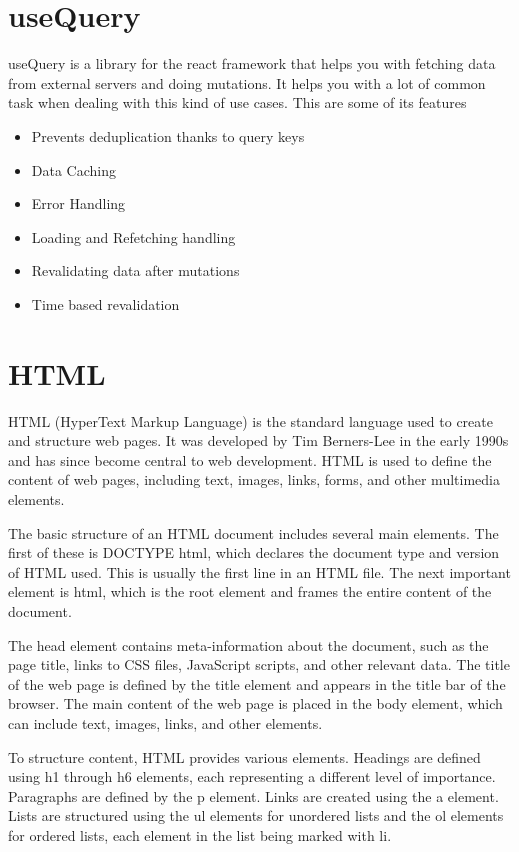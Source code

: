 \section{useQuery}
\label{sec:ch3sec11}
useQuery is a library for the react framework that helps you with fetching data from external servers and doing mutations. It helps you with a lot of common task when dealing with this kind of use cases. This are some of its features
\begin{itemize}
	\item Prevents deduplication thanks to query keys
	\item Data Caching
	\item Error Handling
	\item Loading and Refetching handling
	\item Revalidating data after mutations
	\item Time based revalidation
\end{itemize}

\section{HTML}
\label{sec:ch3sec12}
HTML (HyperText Markup Language) is the standard language used to create and structure web pages. It was developed by Tim Berners-Lee in the early 1990s and has since become central to web development. HTML is used to define the content of web pages, including text, images, links, forms, and other multimedia elements.

The basic structure of an HTML document includes several main elements. The first of these is DOCTYPE html, which declares the document type and version of HTML used. This is usually the first line in an HTML file. The next important element is html, which is the root element and frames the entire content of the document.

The head element contains meta-information about the document, such as the page title, links to CSS files, JavaScript scripts, and other relevant data. The title of the web page is defined by the title element and appears in the title bar of the browser. The main content of the web page is placed in the body element, which can include text, images, links, and other elements.

To structure content, HTML provides various elements. Headings are defined using h1 through h6 elements, each representing a different level of importance. Paragraphs are defined by the p element. Links are created using the a element. Lists are structured using the ul elements for unordered lists and the ol elements for ordered lists, each element in the list being marked with li.

